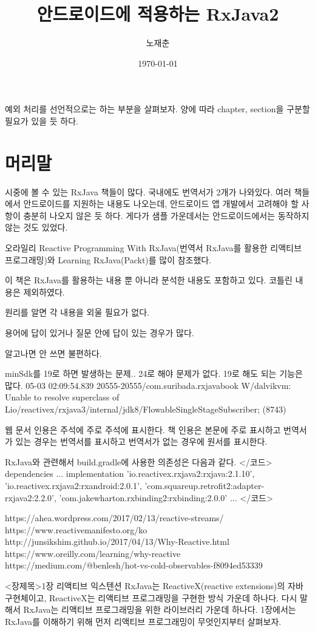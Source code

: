 \documentclass{book}
\title{안드로이드에 적용하는 RxJava2}
\author{노재춘}
\date{\today}
\begin{document}
 
\maketitle
예외 처리를 선언적으로는 하는 부분을 살펴보자.
양에 따라 chapter, section을 구분할 필요가 있을 듯 하다.
\chapter*{머리말}
시중에 볼 수 있는 RxJava 책들이 많다. 국내에도 번역서가 2개가 나와있다. 
여러 책들에서 안드로이드를 지원하는 내용도 나오는데, 안드로이드 앱 개발에서 고려해야 할 사항이 충분히 나오지 않은 듯 하다. 게다가 샘플 가운데서는 안드로이드에서는 동작하지 않는 것도 있었다.

오라일리 Reactive Programming With RxJava(번역서 RxJava를 활용한 리액티브 프로그래밍)와 Learning RxJava(Packt)를 많이 참조했다.

이 책은 RxJava를 활용하는 내용 뿐 아니라 분석한 내용도 포함하고 있다.
코틀린 내용은 제외하였다.

원리를 알면 각 내용을 외울 필요가 없다. 

용어에 답이 있거나 질문 안에 답이 있는 경우가 많다.

알고나면 안 쓰면 불편하다.
\tableofcontents

minSdk를 19로 하면 발생하는 문제.. 24로 해야 문제가 없다. 19로 해도 되는 기능은 많다.
05-03 02:09:54.839 20555-20555/com.suribada.rxjavabook W/dalvikvm: Unable to resolve superclass of Lio/reactivex/rxjava3/internal/jdk8/FlowableSingleStageSubscriber; (8743)


웹 문서 인용은 주석에 주로 주석에 표시한다. 책 인용은 본문에 주로 표시하고 번역서가 있는 경우는 번역서를 표시하고 번역서가 없는 경우에 원서를 표시한다. 


RxJava와 관련해서 build.gradle에 사용한 의존성은 다음과 같다.
</코드>
dependencies {
    ...
    implementation 'io.reactivex.rxjava2:rxjava:2.1.10',
        'io.reactivex.rxjava2:rxandroid:2.0.1',
        'com.squareup.retrofit2:adapter-rxjava2:2.2.0',
        'com.jakewharton.rxbinding2:rxbinding:2.0.0'
    ...
}
</코드>


https://ahea.wordpress.com/2017/02/13/reactive-streams/
https://www.reactivemanifesto.org/ko
http://junsikshim.github.io/2017/04/13/Why-Reactive.html
https://www.oreilly.com/learning/why-reactive
https://medium.com/@benlesh/hot-vs-cold-observables-f8094ed53339

<장제목>1장 리액티브 익스텐션
RxJava는 ReactiveX(reactive extensions)의 자바 구현체이고, ReactiveX는 리액티브 프로그래밍을 구현한 방식 가운데 하나다. 다시 말해서 RxJava는 리액티브 프로그래밍을 위한 라이브러리 가운데 하나다. 1장에서는 RxJava를 이해하기 위해 먼저 리액티브 프로그래밍이 무엇인지부터 살펴보자. 
\end{document}
